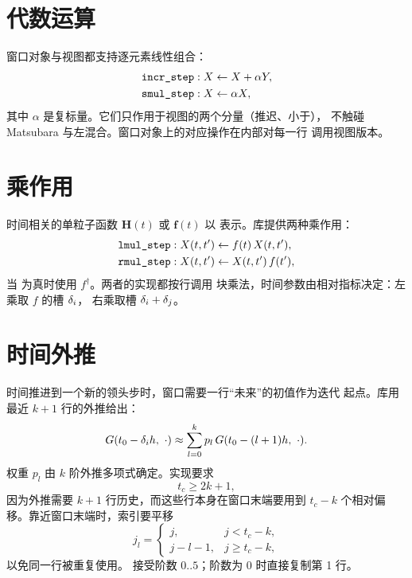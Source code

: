 \section{代数运算}
\label{sec:moving-algebra}

窗口对象与视图都支持逐元素线性组合：
\begin{align}
    \code{incr_step} &: X \leftarrow X + \alpha Y,\\
    \code{smul_step} &: X \leftarrow \alpha X,
\end{align}
其中 $\alpha$ 是复标量。它们只作用于视图的两个分量（推迟、小于），
不触碰 Matsubara 与左混合。窗口对象上的对应操作在内部对每一行
调用视图版本。

\section{乘作用}
\label{sec:moving-multiply}

时间相关的单粒子函数 $\bm{H}(t)$ 或 $\bm{f}(t)$ 以
 表示。库提供两种乘作用：
\begin{align}
    \code{lmul_step} &: X(t,t') \leftarrow f(t)\,X(t,t'),\\
    \code{rmul_step} &: X(t,t') \leftarrow X(t,t')\,f(t'),
\end{align}
当  为真时使用 $f^{\dagger}$。两者的实现都按行调用
块乘法，时间参数由相对指标决定：左乘取 $f$ 的槽 $\delta_i$，
右乘取槽 $\delta_i+\delta_j$。

\section{时间外推}
\label{sec:extrapolation}

时间推进到一个新的领头步时，窗口需要一行“未来”的初值作为迭代
起点。库用最近 $k+1$ 行的外推给出：
\begin{equation}
    G(t_0-\delta_i h,\ \cdot) \approx
    \sum^{k}_{l=0} p_l\,
    G(t_0-(l+1)h,\ \cdot) .
    \label{eq:extrapolation}
\end{equation}
权重 $p_l$ 由 $k$ 阶外推多项式确定。实现要求
\begin{equation}
    t_c \ge 2k+1 ,
\end{equation}
因为外推需要 $k+1$ 行历史，而这些行本身在窗口末端要用到
$t_c-k$ 个相对偏移。靠近窗口末端时，索引要平移
\begin{equation}
    j_l =
    \begin{cases}
        j, & j < t_c-k,\\
        j-l-1, & j\ge t_c-k,
    \end{cases}
\end{equation}
以免同一行被重复使用。
接受阶数 $0..5$；阶数为 $0$ 时直接复制第 1 行。

